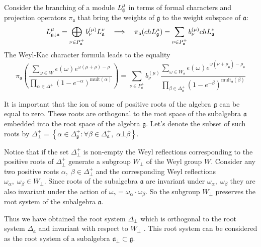 \documentclass[a4paper,12pt]{article}
\theoremstyle{definition} \newtheorem{Def}{Definition}
\begin{document}
Consider the branching of a module $L_{\frak{g}}^{\mu }$ in terms of formal characters and
projection operators $\pi_{\mathfrak{a}}$ that bring the weights of $\mathfrak{g}$ to the weight subspace of $\mathfrak{a}$:
\begin{equation}
  \label{eq:3}
  L_{\frak{g}\downarrow \frak{a}}^{\mu }=\bigoplus\limits_{\nu \in P_{\frak{a}%
    }^{+}}b_{\nu }^{\left( \mu \right) }L_{\frak{a}}^{\nu }\quad
  \Longrightarrow\quad
  \pi_{\mathfrak{a}}(ch L^{\mu}_{\mathfrak{g}})=
  \sum_{\nu\in P^{+}_{\mathfrak{a}}}b^{(\mu)}_{\nu} ch L^{\nu}_{\mathfrak{a}}
\end{equation}
The Weyl-Kac character formula leads to
the equality
\begin{equation}
  \label{eq:4}
  \pi_{\mathfrak{a}}\left(\frac{\sum_{\omega\in W} \epsilon(\omega) e^{\omega(\mu+\rho)-\rho}}
  {\prod_{\alpha\in\Delta^{+}}(1-e^{-\alpha})^{\mathrm{mult}(\alpha)}}\right) =
  \sum_{\nu\in P^{+}_{\mathfrak{a}}}b^{(\mu)}_{\nu}
  \frac{\sum_{\omega\in W_{\mathfrak{a}}}\epsilon(\omega)
  e^{\omega(\nu+\rho_{\mathfrak{a}})-\rho_{\mathfrak{a}}}}
  {\prod_{\beta\in \Delta_{\mathfrak{a}}^{+}}(1-e^{-\beta})^{\mathrm{mult}_{\mathfrak{a}}(\beta)}}
\end{equation}

It is important that the ion of some of positive roots of
the algebra $\mathfrak{g}$ can be equal to zero. These roots are orthogonal to the
root space of the subalgebra $\mathfrak{a}$ embedded into the root space of the
algebra $\mathfrak{g}$. Let's denote the subset of such roots by $\Delta^{+}_{\bot}
=\left\{\alpha\in\Delta_{\mathfrak{g}}^{+}:
\forall \beta\in \Delta_{\mathfrak{a}}^{+},\; \alpha\bot\beta \right\}$.

Notice that if the set $\Delta^{+}_{\bot}$ is non-empty the Weyl reflections
corresponding to the positive roots of $\Delta^{+}_{\bot}$ generate a subgroup
$W_{\bot}$ of the Weyl group $W$. Consider any two positive roots $\alpha,\;
\beta\in \Delta^{+}_{\bot}$ and the corresponding Weyl reflections
$\omega_{\alpha},\; \omega_{\beta}\in W_{\bot}$.  Since roots of the subalgebra
$\mathfrak{a}$ are invariant under $\omega_{\alpha}, \; \omega_{\beta}$ they
are also invariant under the action of $\omega_{\gamma}=\omega_{\alpha}\cdot \omega_{\beta}$.
So the subgroup $W_{\bot}$ preserves the root system of the subalgebra $\mathfrak{a}$.

Thus we have obtained the root system $\Delta_{\bot}$ which is orthogonal to the root
system $\Delta_{\mathfrak{a}}$ and invariant with respect to  $W_{\bot}$ . This root system
can be considered as the root system of a subalgebra $\mathfrak{a}_{\bot}\subset \mathfrak{g}$.
\end{document}
